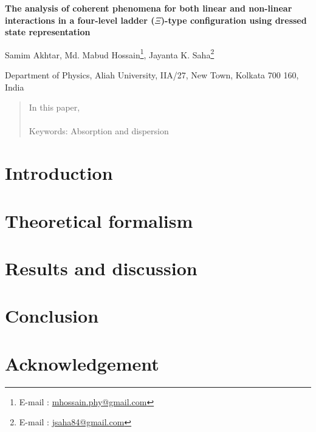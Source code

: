 \documentclass[11pt,a4paper,fleqn]{article}
\begin{document}
\begin{spacing}{1.5}
\begin{center}
{\Large{\textbf{The analysis of coherent phenomena for both linear and non-linear interactions in a four-level ladder ($ \Xi $)-type configuration using dressed state representation   }}}\\[6mm]
\end{center}
\begin{center}
Samim Akhtar, Md. Mabud Hossain{\footnote{\small{E-mail : \url{mhossain.phy@gmail.com}}}}, Jayanta K. Saha{\footnote{\small{E-mail : \url{jsaha84@gmail.com}}}}
\end{center}
\begin{center}
Department of Physics, Aliah University, IIA/27, New Town, Kolkata 700 160, India
\end{center}
\begin{abstract}
In this paper, \\\\
Keywords:  Absorption and dispersion 
\end{abstract}

\section{Introduction}

\section{Theoretical formalism}

\section{Results and discussion}

\section{Conclusion}

\section*{Acknowledgement}
 



\end{spacing}
\end{document}
